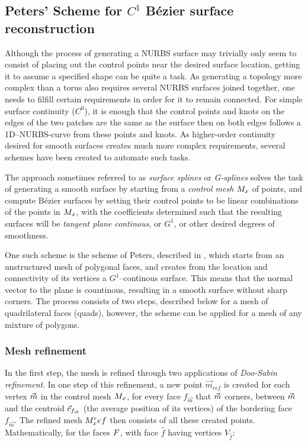 \subsection{Peters' Scheme for $C^1$ B{\'e}zier surface reconstruction}
Although the process of generating a NURBS surface may trivially only seem to consist of placing out the control points near the desired surface location, getting it to assume a specified shape can be quite a task. As generating a topology more complex than a torus  also requires several NURBS surfaces joined together, one needs to filfill certain requirements in order for it to remain connected. For simple surface continuity ($C^0$), it is enough that the control points and knots on the edges of the two patches are the same as the surface then on both edges follows a 1D--NURBS-curve from these points and knots. As higher-order continuity desired for smooth surfaces creates much more complex requirements, several schemes have been created to automate such tasks.

The approach sometimes referred to as \emph{surface splines} or \emph{G-splines} \cite{eck1996automatic} solves the task of generating a smooth surface by starting from a \emph{control mesh} $\petersControlMesh$ of points, and compute B{\'e}zier surfaces by setting their control points to be linear combinations of the points in $\petersControlMesh$, with the coefficients determined such that the resulting surfaces will be \emph{tangent plane continous}, or $G^1$, or other desired degrees of smoothness. 

One such scheme is the scheme of Peters, described in \cite{peters1992constructing}, which starts from an unstructured mesh of polygonal faces, and creates from the location and connectivity of its vertices a $G^1$--continous surface. This means that the normal vector to the plane is countinous, resulting in a smooth surface without sharp corners. The process consists of two steps, described below for a mesh of quadrilateral faces (quads), however, the scheme can be applied for a mesh of any mixture of polygons.

\subsubsection{Mesh refinement}
In the first step, the mesh is refined through two applications of \emph{Doo-Sabin refinement}. In one step of this refinement, a new point $\vec{m}_{ref}$  is created for each vertex $\petersPatchPointVec$ in the control mesh $\petersPatchPoints$, for every face $f_{\vec{m}}$ that $\petersPatchPointVec$ corners,  between $\petersPatchPointVec$ and the centroid $\centroidof{f_{\vec{m}}}$ (the average position of its vertices) of the bordering face $f_{\vec{m}}$. The refined mesh $\petersPatchPoints^ref$ then consists of all these created points. Mathematically, for the faces $\petersFaces$, with face ${\hat{f}}$ having vertices $V_{\hat{f}}$:

